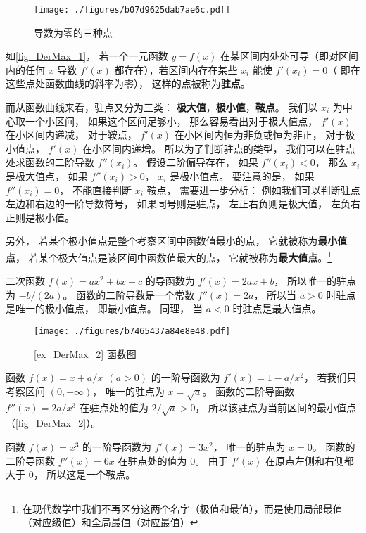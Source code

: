 
\begin{figure}[ht]
\vskip-10pt
\centering
\texttt{[image: ./figures/b07d9625dab7ae6c.pdf]}
\caption{导数为零的三种点}\label{fig_DerMax_1}
\end{figure}

如\autoref{fig_DerMax_1}， 若一个一元函数 $y = f(x)$ 在某区间内处处可导（即对区间内的任何 $x$ 导数 $f'(x)$ 都存在），若区间内存在某些 $x_i$ 能使 $f'(x_i) = 0$（ 即在这些点处函数曲线的斜率为零）， 这样的点被称为\textbf{驻点}。

而从函数曲线来看，驻点又分为三类： \textbf{极大值}，\textbf{极小值}，\textbf{鞍点}。 我们以 $x_i$ 为中心取一个小区间， 如果这个区间足够小， 那么容易看出对于极大值点， $f'(x)$ 在小区间内递减， 对于鞍点， $f'(x)$ 在小区间内恒为非负或恒为非正， 对于极小值点， $f'(x)$ 在小区间内递增。 所以为了判断驻点的类型， 我们可以在驻点处求函数的二阶导数 $f''(x_i)$。 假设二阶偏导存在， 如果 $f''(x_i) < 0$， 那么 $x_i$ 是极大值点， 如果 $f''(x_i) > 0$， $x_i$ 是极小值点。 要注意的是， 如果 $f''(x_i) = 0$， 不能直接判断 $x_i$  鞍点， 需要进一步分析： 例如我们可以判断驻点左边和右边的一阶导数符号， 如果同号则是驻点， 左正右负则是极大值， 左负右正则是极小值。

另外， 若某个极小值点是整个考察区间中函数值最小的点， 它就被称为\textbf{最小值点}， 若某个极大值点是该区间中函数值最大的点， 它就被称为\textbf{最大值点}。\footnote{在现代数学中我们不再区分这两个名字（极值和最值），而是使用局部最值（对应级值）和全局最值（对应最值）}

\begin{example}{}
二次函数 $f(x) = ax^2 + bx + c$ 的导函数为 $f'(x) = 2ax + b$， 所以唯一的驻点为 $-b/(2a)$。 函数的二阶导数是一个常数 $f''(x) = 2a$， 所以当 $a > 0$ 时驻点是唯一的极小值点， 即最小值点。 同理， 当 $a < 0$ 时驻点是最大值点。
\end{example}

\begin{figure}[ht]
\centering
\texttt{[image: ./figures/b7465437a84e8e48.pdf]}
\caption{\autoref{ex_DerMax_2} 函数图} \label{fig_DerMax_2}
\end{figure}

\begin{example}{}\label{ex_DerMax_2}
函数 $f(x) = x+a/x \ \ (a > 0)$ 的一阶导函数为 $f'(x) = 1 - a/x^2$， 若我们只考察区间 $(0, +\infty)$， 唯一的驻点为 $x = \sqrt{a}$。 函数的二阶导函数 $f''(x) = 2a/x^3$ 在驻点处的值为 $2/\sqrt{a} > 0$， 所以该驻点为当前区间的最小值点（\autoref{fig_DerMax_2}）。
\end{example}

\begin{example}{}\label{ex_DerMax_3}
函数 $f(x) = x^3$ 的一阶导函数为 $f'(x) = 3x^2$， 唯一的驻点为 $x = 0$。 函数的二阶导函数 $f''(x) = 6x$ 在驻点处的值为 $0$。 由于 $f'(x)$ 在原点左侧和右侧都大于 0， 所以这是一个鞍点。
\end{example}
